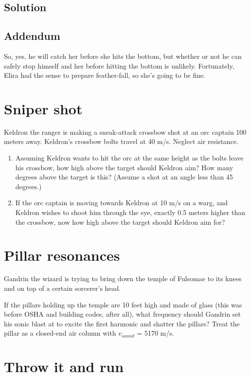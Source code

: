 \documentclass[12pt,letterpaper]{article}
\begin{document}
\subsection{Solution}

\subsection{Addendum}
So, yes, he will catch her before she hits the bottom, but whether or not he can safely stop himself and her before hitting the bottom is unlikely. Fortunately, Elira had the sense to prepare feather-fall, so she's going to be fine.

\section{Sniper shot}

Keldron the ranger is making a sneak-attack crossbow shot at an orc captain 100 meters away. Keldron's crossbow bolts travel at 40 m/s. Neglect air resistance.

\begin{enumerate}
\item Assuming Keldron wants to hit the orc at the same height as the bolts leave his crossbow, how high above the target should Keldron aim? How many degrees above the target is this? (Assume a shot at an angle less than 45 degrees.)
\item If the orc captain is moving towards Keldron at 10 m/s on a warg, and Keldron wishes to shoot him through the eye, exactly 0.5 meters higher than the crossbow, now how high above the target should Keldron aim for?
\end{enumerate}

\section{Pillar resonances}

Gandrin the wizard is trying to bring down the temple of Fulsomae to its knees and on top of a certain sorcerer's head.

If the pillars holding up the temple are 10 feet high and made of glass (this was before OSHA and building codes, after all), what frequency should Gandrin set his sonic blast at to excite the first harmonic and shatter the pillars? Treat the pillar as a closed-end air column with $v_{sound}$ = 5170 m/s.

\section{Throw it and run}
\end{document}
